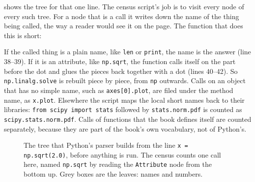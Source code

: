  shows the tree for that one line. The census script's job is to visit every node of every such tree. For a node that is a call it writes down the name of the thing being called, the way a reader would see it on the page. The function that does this is short:


If the called thing is a plain name, like \texttt{len} or \texttt{print}, the name is the answer (line 38--39). If it is an attribute, like \texttt{np.sqrt}, the function calls itself on the part before the dot and glues the pieces back together with a dot (lines 40--42). So \texttt{np.linalg.solve} is rebuilt piece by piece, from \texttt{np} outwards. Calls on an object that has no simple name, such as \texttt{axes[0].plot}, are filed under the method name, as \texttt{x.plot}. Elsewhere the script maps the local short names back to their libraries: \texttt{from scipy import stats} followed by \texttt{stats.norm.pdf} is counted as \texttt{scipy.stats.norm.pdf}. Calls of functions that the book defines itself are counted separately, because they are part of the book's own vocabulary, not of Python's.

\begin{figure}[htbp]
\centering
{}
\caption{The tree that Python's parser builds from the line \texttt{x = np.sqrt(2.0)}, before anything is run. The census counts one call here, named \texttt{np.sqrt} by reading the \texttt{Attribute} node from the bottom up. Grey boxes are the leaves: names and numbers.}
\label{T0a:fig:ast}
\end{figure}

